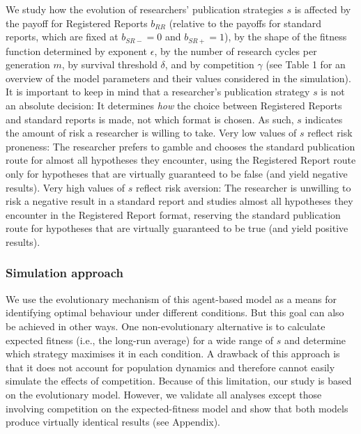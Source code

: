 \documentclass[
  ,man,mask,floatsintext]{apa6}
\begin{document}
We study how the evolution of researchers' publication strategies \(s\) is affected by the payoff for Registered Reports \(b_{RR}\) (relative to the payoffs for standard reports, which are fixed at \(b_{SR-} = 0\) and \(b_{SR+} = 1\)), by the shape of the fitness function determined by exponent \(\epsilon\), by the number of research cycles per generation \(m\), by survival threshold \(\delta\), and by competition \(\gamma\) (see Table 1 for an overview of the model parameters and their values considered in the simulation).
It is important to keep in mind that a researcher's publication strategy \(s\) is
not an absolute decision:
It determines \emph{how} the choice between Registered Reports and standard reports is made, not which format is chosen.
As such, \(s\) indicates the amount of risk a researcher is willing to take.
Very low values of \(s\) reflect risk proneness:
The researcher prefers to gamble and chooses the standard publication route for almost all hypotheses they encounter, using the Registered Report route only for hypotheses that are virtually guaranteed to be false (and yield negative results).
Very high values of \(s\) reflect risk aversion:
The researcher is unwilling to risk a negative result in a standard report and studies almost all hypotheses they encounter in the Registered Report format, reserving the standard publication route for hypotheses that are virtually guaranteed to be true (and yield positive results).

\hypertarget{simulation-approach}{%
\subsubsection{Simulation approach}\label{simulation-approach}}

We use the evolutionary mechanism of this agent-based model as a means for identifying optimal behaviour under different conditions.
But this goal can also be achieved in other ways.
One non-evolutionary alternative is to calculate expected fitness (i.e., the long-run average) for a wide range of \(s\) and determine which strategy maximises it in each condition.
A drawback of this approach is that it does not account for population dynamics and therefore cannot easily simulate the effects of competition.
Because of this limitation, our study is based on the evolutionary model.
However, we validate all analyses except those involving competition on the expected-fitness model and show that both models produce virtually identical results (see Appendix).
\end{document}
